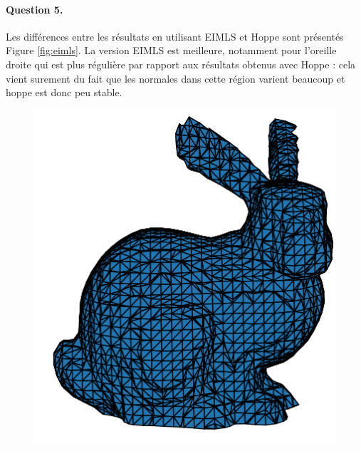 \documentclass[french]{article}
\begin{document}
\paragraph{Question 5.}
Les différences entre les résultats en utilisant EIMLS et Hoppe sont présentés Figure \ref{fig:eimls}. La version EIMLS est meilleure, notamment pour l'oreille droite qui est plus régulière par rapport aux résultats obtenus avec Hoppe : cela vient surement du fait que les normales dans cette région varient beaucoup et hoppe est donc peu stable.
\begin{figure}[h]
	\centering
	\begin{minipage}{0.47\linewidth}
		\centering
		\includegraphics[width=\linewidth]{bunnyhoppe30.png}
	\end{minipage}\hfill
	\begin{minipage}{0.47\linewidth}
		\centering

\end{minipage}
\end{figure}
\end{document}

